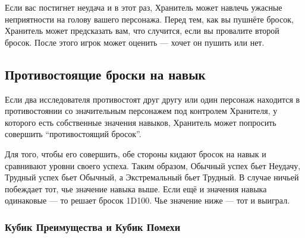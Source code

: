 \documentclass[letterpaper,twocolumn,openany, twoside, 11pt, usenames]{cocbook}
\newlength{\seplinewidth}
\newlength{\seplinesep}
\newcommand*{\sepline}{%
  \par
  \vspace{\dimexpr\seplinesep+.5\parskip}%
  \cleaders\vbox{%
    \begingroup %
      \color{sepline}%
      \hrule width\linewidth height\seplinewidth
    \endgroup
  }\vskip\seplinewidth
  \vspace{\dimexpr\seplinesep-.5\parskip}%
}
\begin{document}

Если вас постигнет неудача и в этот раз, Хранитель может навлечь ужасные неприятности на голову вашего персонажа. Перед тем, как вы пушнёте бросок, Хранитель может предсказать вам, что случится, если вы провалите второй бросок. После этого игрок может оценить --- хочет он пушить или нет.
\smallbreak
\noindent {}

\subsection*{Противостоящие броски на навык}

Если два исследователя противостоят друг другу или один персонаж находится в противостоянии со значительным персонажем под контролем Хранителя, у которого есть собственные значения навыков, Хранитель может попросить совершить ``противостоящий бросок''.

Для того, чтобы его совершить, обе стороны кидают бросок на навык и сравнивают уровни своего успеха. Таким образом, Обычный успех бьет Неудачу, Трудный успех бьет Обычный, а Экстремальный бьет Трудный. В случае ничьей побеждает тот, чье значение навыка выше. Если ещё и значения навыка одинаковые --- то решает бросок 1D100. Чье значение ниже --- тот и выиграл.

\subsubsection*{Кубик Преимущества и Кубик Помехи}
\end{document}

